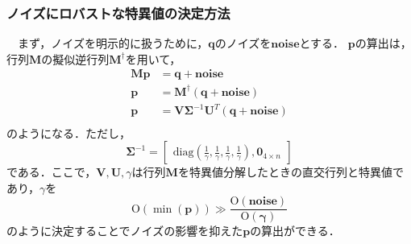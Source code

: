 \documentclass[a4paper]{jarticle}
\begin{document}
\subsubsection{ノイズにロバストな特異値の決定方法}
\label{subsubsec:noise_robust}
　まず，ノイズを明示的に扱うために，$\mathbf{q}$のノイズを$\mathbf{noise}$とする．
$\mathbf{p}$の算出は，行列$\mathbf{M}$の擬似逆行列$\mathbf{M}^{\dagger}$を用いて，
\begin{equation}
    \begin{aligned}
    \mathbf{M}\mathbf{p} &= \mathbf{q} + \mathbf{noise}\\
              \mathbf{p} &= \mathbf{M}^{\dagger}(\mathbf{q} + \mathbf{noise})\\ 
            \mathbf{p} &= \mathbf{V}\mathbf{\Sigma}^{-1}\mathbf{U}^T(\mathbf{q}+\mathbf{noise})\\
    \end{aligned}
\end{equation}
のようになる．ただし，
\begin{equation}
            \mathbf{\Sigma}^{-1} =
            \begin{bmatrix}
                 \mathrm{diag}(\frac{1}{\gamma}, \frac{1}{\gamma}, \frac{1}{\gamma}, \frac{1}{\gamma}), \mathbf{0}_{4 \times n}
            \end{bmatrix}
\end{equation}
である．ここで，$\mathbf{V},\mathbf{U},\gamma$は行列$\mathbf{M}$を特異値分解したときの直交行列と特異値であり，$\gamma$を
\begin{equation}
    \mathrm{O}(\min({\mathbf{p}})) \gg \frac{\mathrm{O}(\mathbf{noise})}{\mathrm{O}(\mathbf{\gamma})}
    \label{eq:gamma}
\end{equation}
のように決定することでノイズの影響を抑えた$\mathbf{p}$の算出ができる．
\end{document}
